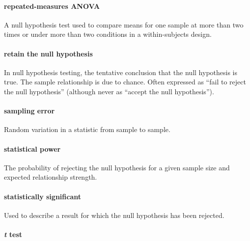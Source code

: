 \documentclass[
]{krantz}
\begin{document}
\paragraph*{repeated-measures ANOVA}\label{repeated-measures-anova-1}

A null hypothesis test used to compare means for one sample at more than two times or under more than two conditions in a within-subjects design.

\paragraph*{retain the null hypothesis}\label{retain-the-null-hypothesis}

In null hypothesis testing, the tentative conclusion that the null hypothesis is true. The sample relationship is due to chance. Often expressed as ``fail to reject the null hypothesis'' (although never as ``accept the null hypothesis'').

\paragraph*{sampling error}\label{sampling-error}

Random variation in a statistic from sample to sample.

\paragraph*{statistical power}\label{statistical-power-1}

The probability of rejecting the null hypothesis for a given sample size and expected relationship strength.

\paragraph*{statistically significant}\label{statistically-significant}

Used to describe a result for which the null hypothesis has been rejected.

\paragraph*{\texorpdfstring{\emph{t} test}{t test}}\label{t-test}
\end{document}
